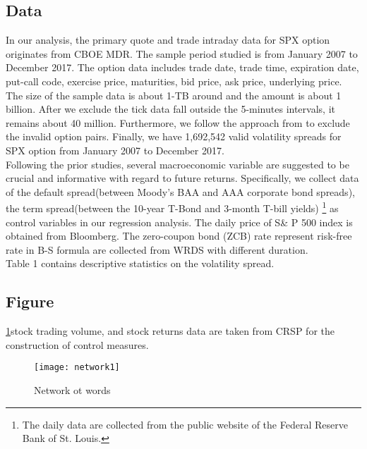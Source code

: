 \subsection{Data}
In our analysis, the primary quote and trade intraday data for SPX option originates from CBOE MDR. The sample period studied is from January 2007 to December 2017. The option data includes trade date, trade time, expiration date, put-call code, exercise price, maturities, bid price, ask price, underlying price. The size of the sample data is about 1-TB around and the amount is about 1 billion. After we exclude the tick data fall outside the 5-minutes intervals, it remains about 40 million. Furthermore, we follow the approach from \textcite{ofek2004limited} to exclude the invalid option pairs. Finally, we have 1,692,542 valid volatility spreads for SPX option from January 2007 to December 2017. 
\\

Following the prior studies\textcite{bollerslev2009expected}, several macroeconomic variable are suggested to be crucial and informative with regard to future returns. Specifically, we collect data of the default spread(between Moody's BAA and AAA corporate bond spreads), the term spread(between the 10-year T-Bond and 3-month T-bill yields) \footnote{The daily data are collected from the public website of the Federal Reserve Bank of St. Louis.} as control variables in our regression analysis. 
The daily price of S\& P 500 index is obtained from Bloomberg. The zero-coupon bond (ZCB) rate represent risk-free rate in B-S formula are collected from WRDS with different duration. 
\\

Table 1 contains descriptive statistics on the volatility spread. 


\subsection{Figure}
\ref{fig:Network}stock trading volume, and stock returns data are taken from CRSP for the construction of control measures.

\begin{figure}[h]
\centering
\texttt{[image: network1]}
\caption{Network ot words}
\label{fig:Network}
\end{figure}



